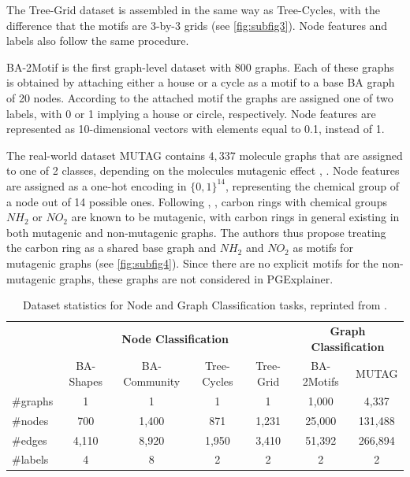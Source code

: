 The Tree-Grid dataset is assembled in the same way as Tree-Cycles, with the difference that the motifs are 3-by-3 grids (see \ref{fig:subfig3}). Node features and labels also follow the same procedure.

BA-2Motif is the first graph-level dataset with 800 graphs. Each of these graphs is obtained by attaching either a house or a cycle as a motif to a base BA graph of 20 nodes. According to the attached motif the graphs are assigned one of two labels, with 0 or 1 implying a house or circle, respectively. Node features are represented as 10-dimensional vectors with elements equal to 0.1, instead of 1.

The real-world dataset MUTAG contains $4,337$ molecule graphs that are assigned to one of 2 classes, depending on the molecules mutagenic effect \cite{riesen2008iam}, \cite{ying2019gnnexplainer}. Node features are assigned as a one-hot encoding in $\{0,1\}^{14}$, representing the chemical group of a node out of 14 possible ones. Following \cite{debnath1991structure}, \cite{ying2019gnnexplainer}, carbon rings with chemical groups $NH_2$ or $NO_2$ are known to be mutagenic, with carbon rings in general existing in both mutagenic and non-mutagenic graphs. The authors thus propose treating the carbon ring as a shared base graph and $NH_2$ and $NO_2$ as motifs for mutagenic graphs (see \ref{fig:subfig4}). Since there are no explicit motifs for the non-mutagenic graphs, these graphs are not considered in PGExplainer.

\begin{table}[h]
    \centering
    \small
    \begin{tabular}{l|cccc|cc}
    \multicolumn{1}{c}{\textbf{}} & \multicolumn{4}{c}{\textbf{Node Classification}} & \multicolumn{2}{c}{\textbf{Graph Classification}} \\
    \addlinespace
    \textbf{} & BA-Shapes & BA-Community & Tree-Cycles & Tree-Grid & BA-2Motifs & MUTAG \\
    \hline
    \#graphs & 1 & 1 & 1 & 1 & 1,000 & 4,337 \\
    \#nodes  & 700 & 1,400 & 871 & 1,231 & 25,000 & 131,488 \\
    \#edges  & 4,110 & 8,920 & 1,950 & 3,410 & 51,392 & 266,894 \\
    \#labels & 4 & 8 & 2 & 2 & 2 & 2 \\
    \end{tabular}
    \caption[Statistics of PGExplainer datasets]{Dataset statistics for Node and Graph Classification tasks, reprinted from \cite{luo2020parameterized}.}
    \label{tab:dataset-statistics}
\end{table}

